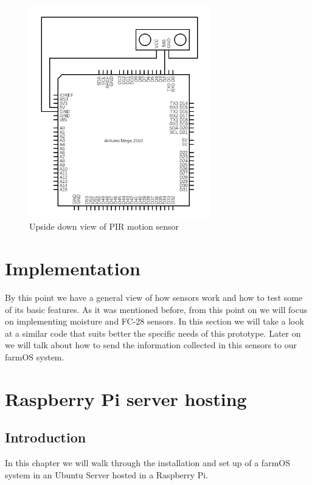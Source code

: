 \begin{figure}[H]
    \centering
    \includegraphics[width=0.7\textwidth]{fig/ultrasonic-scheme-circuit.png}
    \caption{Upside down view of PIR motion sensor}
    \label{fig:ultrasonic-scheme-circuit}
\end{figure}




\section{Implementation}
By this point we have a general view of how sensors work and how to test some of its basic features. As it was mentioned before, from this point on we will focus on implementing moisture and FC-28 sensors. In this section we will take a look at a similar code that suits better the specific needs of this prototype. Later on we will talk about how to send the information collected in this sensors to our farmOS system.

\section{Raspberry Pi server hosting}

\subsection{Introduction}
In this chapter we will walk through the installation and set up of a farmOS system in an Ubuntu Server hosted in a Raspberry Pi.


